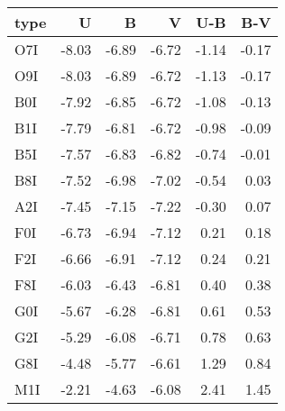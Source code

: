 \begin{tabular}{lrrrrr}
\toprule
type &     U &     B &     V &   U-B &   B-V \\
\midrule
 O7I & -8.03 & -6.89 & -6.72 & -1.14 & -0.17 \\
 O9I & -8.03 & -6.89 & -6.72 & -1.13 & -0.17 \\
 B0I & -7.92 & -6.85 & -6.72 & -1.08 & -0.13 \\
 B1I & -7.79 & -6.81 & -6.72 & -0.98 & -0.09 \\
 B5I & -7.57 & -6.83 & -6.82 & -0.74 & -0.01 \\
 B8I & -7.52 & -6.98 & -7.02 & -0.54 &  0.03 \\
 A2I & -7.45 & -7.15 & -7.22 & -0.30 &  0.07 \\
 F0I & -6.73 & -6.94 & -7.12 &  0.21 &  0.18 \\
 F2I & -6.66 & -6.91 & -7.12 &  0.24 &  0.21 \\
 F8I & -6.03 & -6.43 & -6.81 &  0.40 &  0.38 \\
 G0I & -5.67 & -6.28 & -6.81 &  0.61 &  0.53 \\
 G2I & -5.29 & -6.08 & -6.71 &  0.78 &  0.63 \\
 G8I & -4.48 & -5.77 & -6.61 &  1.29 &  0.84 \\
 M1I & -2.21 & -4.63 & -6.08 &  2.41 &  1.45 \\
\bottomrule
\end{tabular}
